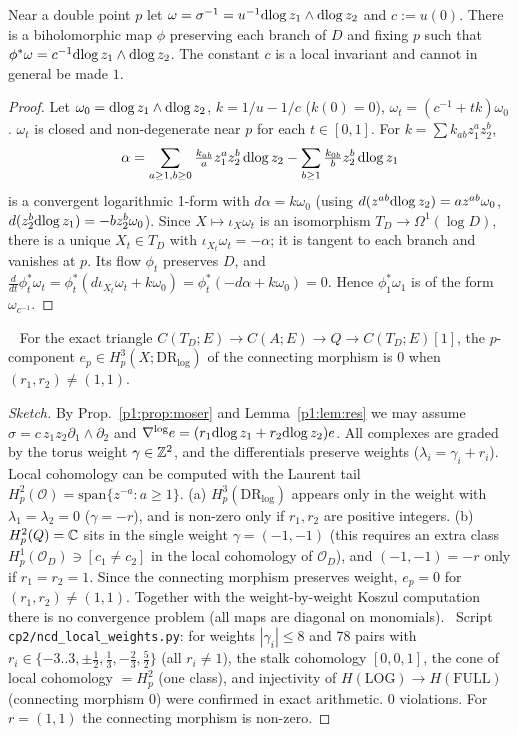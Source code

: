 \begin{prop}\tP\label{p1:prop:moser}
Near a double point $p$ let $\omega=\sigma^{-1}=u^{-1}\mathrm{dlog}\, z_1\wedge\mathrm{dlog}\, z_2$ and $c:=u(0)$. There is a biholomorphic map $\phi$ preserving each branch of $D$ and fixing $p$ such that $\phi^*\omega=c^{-1}\mathrm{dlog}\, z_1\wedge\mathrm{dlog}\, z_2$. The constant $c$ is a local invariant and cannot in general be made $1$.
\end{prop}
\begin{proof}
Let $\omega_0=\mathrm{dlog}\, z_1\wedge\mathrm{dlog}\, z_2$, $k=1/u-1/c$ ($k(0)=0$), $\omega_t=(c^{-1}+tk)\omega_0$. $\omega_t$ is closed and non-degenerate near $p$ for each $t\in[0,1]$. For $k=\sum k_{ab}z_1^az_2^b$,
\[\alpha=\sum_{a\ge1,b\ge0}\tfrac{k_{ab}}{a}z_1^az_2^b\,\mathrm{dlog}\, z_2-\sum_{b\ge1}\tfrac{k_{0b}}{b}z_2^b\,\mathrm{dlog}\, z_1\]
is a convergent logarithmic 1-form with $d\alpha=k\omega_0$ (using $d(z^{ab}\mathrm{dlog}\, z_2)=az^{ab}\omega_0$, $d(z_2^b\mathrm{dlog}\, z_1)=-bz_2^b\omega_0$). Since $X\mapsto\iota_X\omega_t$ is an isomorphism $T_D\to\Omega^1(\log D)$, there is a unique $X_t\in T_D$ with $\iota_{X_t}\omega_t=-\alpha$; it is tangent to each branch and vanishes at $p$. Its flow $\phi_t$ preserves $D$, and $\tfrac{d}{dt}\phi_t^*\omega_t=\phi_t^*(d\iota_{X_t}\omega_t+k\omega_0)=\phi_t^*(-d\alpha+k\omega_0)=0$. Hence $\phi_1^*\omega_1$ is of the form $\omega_{c^{-1}}$.\qedhere
\end{proof}
\begin{lem}\tP\ \tV\label{p1:lem:conn}
For the exact triangle $C(T_D;E)\to C(A;E)\to Q\to C(T_D;E)[1]$, the $p$-component $e_p\in H^3_p(X;\mathrm{DR}_{\log})$ of the connecting morphism is $0$ when $(r_1,r_2)\ne(1,1)$.
\end{lem}
\begin{proof}[Sketch]
By Prop.~\ref{p1:prop:moser} and Lemma~\ref{p1:lem:res} we may assume $\sigma=c\,z_1z_2\partial_1\wedge\partial_2$ and $\nabla^{\log}e=(r_1\mathrm{dlog}\, z_1+r_2\mathrm{dlog}\, z_2)e$. All complexes are graded by the torus weight $\gamma\in\mathbb Z^2$, and the differentials preserve weights ($\lambda_i=\gamma_i+r_i$). Local cohomology can be computed with the Laurent tail $H^2_p(\mathcal O)=\mathrm{span}\{z^{-a}:a\ge1\}$. (a) $H^3_p(\mathrm{DR}_{\log})$ appears only in the weight with $\lambda_1=\lambda_2=0$ ($\gamma=-r$), and is non-zero only if $r_1,r_2$ are positive integers. (b) $H^2_p(Q)=\mathbb C$ sits in the single weight $\gamma=(-1,-1)$ (this requires an extra class $H^1_p(\mathcal O_D)\ni[c_1\ne c_2]$ in the local cohomology of $\mathcal O_D$), and $(-1,-1)=-r$ only if $r_1=r_2=1$. Since the connecting morphism preserves weight, $e_p=0$ for $(r_1,r_2)\ne(1,1)$. Together with the weight-by-weight Koszul computation there is no convergence problem (all maps are diagonal on monomials).
\tV\ Script \texttt{cp2/ncd\_local\_weights.py}: for weights $|\gamma_i|\le8$ and 78 pairs with $r_i\in\{-3..3,\pm\frac12,\frac13,-\frac23,\frac52\}$ (all $r_i\ne1$), the stalk cohomology $[0,0,1]$, the cone of local cohomology $=H^2_p$ (one class), and injectivity of $H(\mathrm{LOG})\to H(\mathrm{FULL})$ (connecting morphism $0$) were confirmed in exact arithmetic. 0 violations. For $r=(1,1)$ the connecting morphism is non-zero.
\end{proof}
